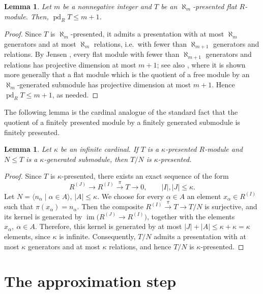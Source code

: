 \documentclass[12pt]{amsart}
\newtheorem{lemma}[theorem]{Lemma}
\theoremstyle{remark}
\theoremstyle{definition}
\theoremstyle{plain}
\DeclareMathOperator{\pd}{pd}
\DeclareMathOperator{\im}{im}
\newcommand{\alephm}{\aleph_m}
\begin{document}
\begin{lemma}\label{lem2.4}
Let $m$ be a nonnegative integer and $T$ be an $\alephm$-presented flat $R$-module. Then, $\pd_RT\le m+1$.
\end{lemma}

\begin{proof}
Since $T$ is $\aleph_m$-presented, it admits a presentation with at most
$\aleph_m$ generators and at most $\aleph_m$ relations, i.e.\ with fewer than $\aleph_{m+1}$ generators and relations. By Jensen \cite[Proposition~5.3]{Jen}, every flat module with fewer than $\aleph_{m+1}$ generators and relations has projective dimension at
most $m+1$; see also \cite[Theorem~2.45]{Oso}, where it is shown more generally that a flat module which is the quotient of a free module by an $\alephm$-generated submodule has projective dimension at most $m+1$. Hence $\pd_RT\le m+1$, as needed.
\end{proof}

The following lemma is the cardinal analogue of the standard fact that the quotient of a finitely presented module by a finitely generated submodule is finitely presented.

\begin{lemma}\label{lem2.5} Let $\kappa$ be an infinite cardinal. If $T$ is a $\kappa$-presented
$R$-module and $N\leq T$ is a $\kappa$-generated submodule, then
$T/N$ is $\kappa$-presented.
\end{lemma}

\begin{proof}
Since $T$ is $\kappa$-presented, there exists an exact sequence of the form
\[
R^{(J)} \rightarrow R^{(I)}
\xrightarrow{\pi} T \rightarrow 0,
\qquad |I|,|J|\leq \kappa.
\]
Let
$
N=\langle n_\alpha\mid \alpha\in A\rangle$, $|A|\leq \kappa$.
We choose for every $\alpha\in A$ an element $x_\alpha\in R^{(I)}$
such that $\pi(x_\alpha)=n_\alpha$. Then the composite
$
R^{(I)}\xrightarrow{\pi}T\rightarrow T/N
$
is surjective, and its kernel is generated by
$
\im\bigl(R^{(J)}\to R^{(I)}\bigr)$, together with the elements $x_\alpha,\ \alpha\in A$.
Therefore, this kernel is generated by at most
$
|J|+|A|\leq \kappa+\kappa=\kappa
$
elements, since $\kappa$ is infinite. Consequently, $T/N$ admits a presentation
with at most $\kappa$ generators and at most $\kappa$ relations, and hence
$T/N$ is $\kappa$-presented.
\end{proof}

\section{The approximation step}\label{sec:step}
\end{document}
